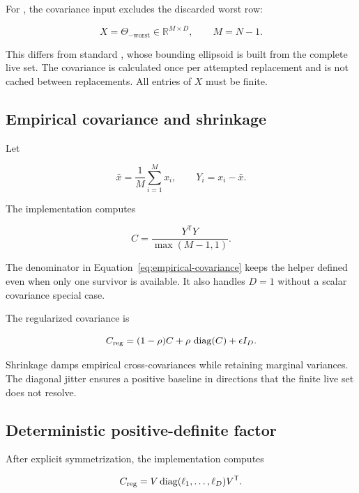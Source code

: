 \documentclass[11pt,a4paper]{article}
\newcommand{\code}[1]{\texttt{\detokenize{#1}}}
\newcommand{\R}{\mathbb{R}}
\begin{document}
For \code{s-rwalk}, the covariance input excludes the discarded worst row:

\begin{equation}
  X=\Theta_{-\mathrm{worst}}\in\R^{M\times D},
  \qquad M=N-1.
\end{equation}

This differs from standard \code{rwalk}, whose bounding ellipsoid is built
from the complete live set.  The \code{s-rwalk} covariance is calculated once
per attempted replacement and is not cached between replacements.  All
entries of \(X\) must be finite.

\subsection{Empirical covariance and shrinkage}

Let

\begin{equation}
  \bar{x}=\frac{1}{M}\sum_{i=1}^{M}x_i,
  \qquad
  Y_i=x_i-\bar{x}.
\end{equation}

The implementation computes

\begin{equation}
  C=\frac{Y^\mathsf{T}Y}{\max(M-1,1)}.
  \label{eq:empirical-covariance}
\end{equation}

The denominator in Equation~\eqref{eq:empirical-covariance} keeps the helper
defined even when only one survivor is available.  It also handles \(D=1\)
without a scalar covariance special case.

The regularized covariance is

\begin{equation}
  C_{\rm reg}
  =(1-\rho)C+\rho\,\operatorname{diag}(C)+\epsilon I_D.
  \label{eq:regularized-covariance}
\end{equation}

Shrinkage damps empirical cross-covariances while retaining marginal
variances.  The diagonal jitter ensures a positive baseline in directions
that the finite live set does not resolve.

\subsection{Deterministic positive-definite factor}

After explicit symmetrization, the implementation computes

\begin{equation}
  C_{\rm reg}=V\operatorname{diag}(\ell_1,\ldots,\ell_D)V^\mathsf{T}.
\end{equation}
\end{document}
